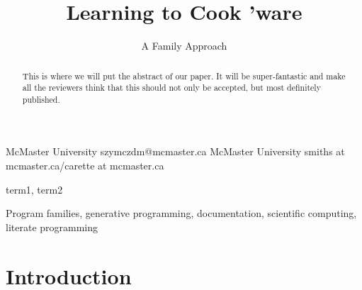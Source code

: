 \documentclass[10pt, preprint]{sigplanconf}
\begin{document}
\setlength{\pdfpageheight}{\paperheight}
\setlength{\pdfpagewidth}{\paperwidth}






\title{Learning to Cook 'ware}
\subtitle{A Family Approach} %

           {McMaster University}
           {szymczdm@mcmaster.ca}
           {McMaster University}
           {smiths at mcmaster.ca/carette at mcmaster.ca}

\maketitle

\begin{abstract}
This is where we will put the abstract of our paper. It will be super-fantastic and make all the reviewers think that this should not only be accepted, but most definitely published. %
\end{abstract}


\terms
term1, term2 %

\keywords
Program families, generative programming, documentation, scientific computing, literate programming %

\section{Introduction} 
\end{document}
